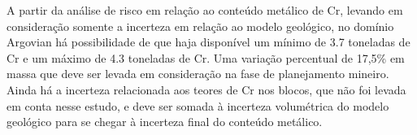 A partir da análise de risco em relação ao conteúdo metálico de Cr, levando em consideração somente a incerteza em relação ao modelo geológico, no domínio Argovian há possibilidade de que haja disponível um mínimo de 3.7 toneladas de Cr e um máximo de 4.3 toneladas de Cr. Uma variação percentual de 17,5\% em massa que deve ser levada em consideração na fase de planejamento mineiro. Ainda há a incerteza relacionada aos teores de Cr nos blocos, que não foi levada em conta nesse estudo, e deve ser somada à incerteza volumétrica do modelo geológico para se chegar à incerteza final do conteúdo metálico.